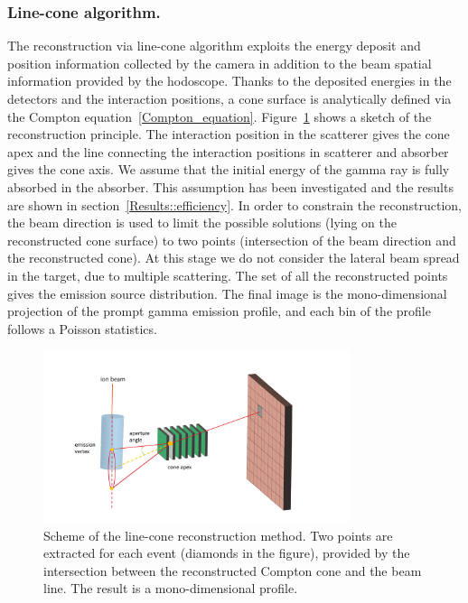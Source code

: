 \subsubsection{Line-cone algorithm.}
The reconstruction via line-cone algorithm exploits the energy deposit and position information collected by the camera in addition to the beam spatial information provided by the hodoscope. Thanks to the deposited energies in the detectors and the interaction positions, a cone surface is analytically defined via the Compton equation~\ref{Compton_equation}. Figure~\ref{fig:reconstruction_scheme} shows a sketch of the reconstruction principle. The interaction position in the scatterer gives the cone apex and the line connecting the interaction positions in scatterer and absorber gives the cone axis. We assume that the initial energy of the gamma ray is fully absorbed in the absorber. This assumption has been investigated and the results are shown in section~\ref{Results::efficiency}. In order to constrain the reconstruction, the beam direction is used to limit the possible solutions (lying on the reconstructed cone surface) to two points (intersection of the beam direction and the reconstructed cone). At this stage we do not consider the lateral beam spread in the target, due to multiple scattering. The set of all the reconstructed points gives the emission source distribution. The final image is the mono-dimensional projection of the prompt gamma emission profile, and each bin of the profile follows a Poisson statistics. 

\begin{figure}
\centering
  \includegraphics[width=0.8\textwidth]{./Figure/reconstruction_scheme}
  \caption{Scheme of the line-cone reconstruction method. Two points are extracted for each event (diamonds in the figure), provided by the intersection between the reconstructed Compton cone and the beam line. The result is a mono-dimensional profile.}	
  \label{fig:reconstruction_scheme}
\end{figure}

